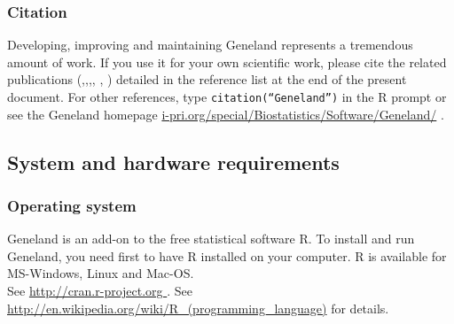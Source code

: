 \documentclass{article}
\begin{document}




\subsubsection{Citation}
Developing, improving and maintaining {\sc Geneland} represents a tremendous  amount of work.  
 If you use it for your own scientific work, 
please cite the related publications (\cite{Guillot05a},\cite{Guillot05c},\cite{Guillot08a},\cite{Guillot08b}, 
\cite{Guillot10b}, \cite{Guedj11}) 
detailed in the reference list at the end of the present document. 
For other references, type {\tt citation(``Geneland'')} in the R prompt or see the {\sc Geneland} homepage 
\url{i-pri.org/special/Biostatistics/Software/Geneland/} .



\subsection{System and hardware requirements}
\subsubsection{Operating system}

{\sc Geneland} is an add-on to the free statistical software {\sc R}. 
To install and run {\sc Geneland}, 
you need first to have R installed on your computer. R is available for MS-Windows, Linux and Mac-OS. \\
See \url{http://cran.r-project.org }.
See \url{ http://en.wikipedia.org/wiki/R\_(programming\_language)} for details.\\


 
\end{document}
